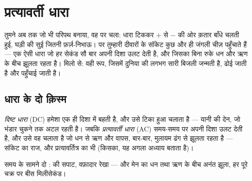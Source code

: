 \chapter{प्रत्यावर्ती धारा}\label{ch:g9:alternating-current}

तुमने अब तक जो भी परिपथ बनाया, वह  पर चला: धारा टिककर $+$ से $-$
की ओर क़तार बाँधे चलती हुई, घड़ी की सुई जितनी फ़र्ज़-निभाऊ। पर तुम्हारी
दीवारों के सॉकेट कुछ और ही जंगली चीज़ पहुँचाते हैं --- एक ऐसी धारा जो
हर सेकंड सौ बार अपनी दिशा उलट देती है, और जिसका  बिना रुके
धन और ऋण के बीच झूलता रहता है। मिलो  से: वही रूप,
जिसमें दुनिया की लगभग सारी बिजली जन्मती है, ढोई जाती है और पहुँचाई
जाती है।

\section{धारा के दो क़िस्म}

\begin{definition}[दिष्ट और प्रत्यावर्ती धारा]\label{def:g9:alternating-current:dcac}
\emph{दिष्ट धारा} (DC) हमेशा एक ही दिशा में बहती है,
और उसे टिका हुआ  चलाता है --- यानी  की देन, जो भंडार
चुकने तक अटल रहती है। जबकि \emph{प्रत्यावर्ती धारा} (AC) समय-समय पर अपनी दिशा उलट देती है, और उसे वह  चलाता
है जो धन से ऋण और वापस, बार-बार, मुलायम ढंग से झूलता रहता है ---
सॉकेट का राज, और प्रत्यावर्तित्र का भी (किसका, यह अगला अध्याय बताता
है)।
\end{definition}

\begin{omfigure}

{\small समय के सामने दो :  की सपाट, वफ़ादार रेखा --- और
मेन का धन तथा ऋण के बीच अनंत झूला, हर पूरे चक्र पर बीस मिलीसेकंड।}
\end{omfigure}

